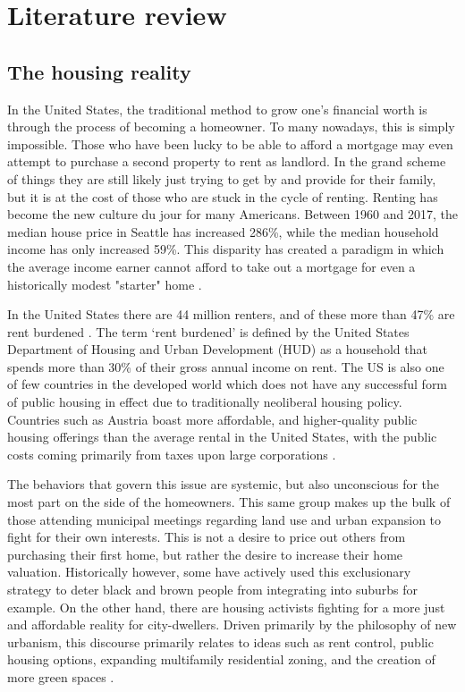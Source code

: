 \chapter{Literature review}

\section{The housing reality}

In the United States, the traditional method to grow one’s financial worth is through the process of becoming a homeowner. To many nowadays, this is simply impossible. Those who have been lucky to be able to afford a mortgage may even attempt to purchase a second property to rent as landlord. In the grand scheme of things they are still likely just trying to get by and provide for their family, but it is at the cost of those who are stuck in the cycle of renting. Renting has become the new culture du jour for many Americans. Between 1960 and 2017, the median house price in Seattle has increased 286\%, while the median household income has only increased 59\%. This disparity has created a paradigm in which the average income earner cannot afford to take out a mortgage for even a historically modest "starter" home \cite{tekinTimelineAffordabilityHow2021}.

In the United States there are 44 million renters, and of these more than 47\% are rent burdened \cite{kontokostaEnergyCostBurdens2020a}. The term ‘rent burdened’ is defined by the United States Department of Housing and Urban Development (HUD) as a household that spends more than 30\% of their gross annual income on rent. The US is also one of few countries in the developed world which does not have any successful form of public housing in effect due to traditionally neoliberal housing policy. Countries such as Austria boast more affordable, and higher-quality public housing offerings than the average rental in the United States, with the public costs coming primarily from taxes upon large corporations \cite{forrestViennaAffordableHousinga}.

The behaviors that govern this issue are systemic, but also unconscious for the most part on the side of the homeowners. This same group makes up the bulk of those attending municipal meetings regarding land use and urban expansion to fight for their own interests. This is not a desire to price out others from purchasing their first home, but rather the desire to increase their home valuation. Historically however, some have actively used this exclusionary strategy to deter black and brown people from integrating into suburbs for example. On the other hand, there are housing activists fighting for a more just and affordable reality for city-dwellers. Driven primarily by the philosophy of new urbanism, this discourse primarily relates to ideas such as rent control, public housing options, expanding multifamily residential zoning, and the creation of more green spaces \cite{10.2307/24392672}.


